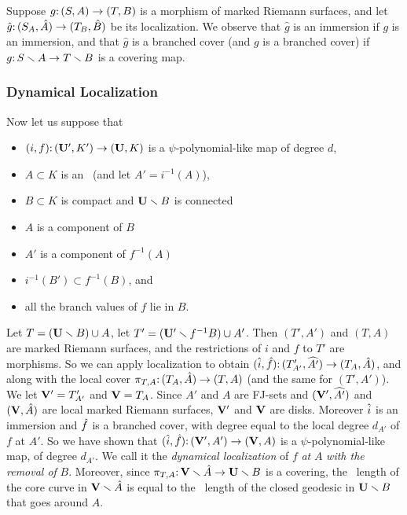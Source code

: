 Suppose $g\mathpunct: (S, A) \to (T, B)$ is a morphism of marked Riemann surfaces,
and let $\hat g\mathpunct: (S_A, \hat A) \to (T_B, \hat B)$ be its localization.
We observe that $\hat g$ is an immersion if $g$ is an immersion,
and that $\hat g$ is a branched cover (and $g$ is a branched cover) if $g\mathpunct: S\smallsetminus A\to T \smallsetminus B$ is a covering map. 


\newcommand{\vv}{\BU \sm B}
\newcommand{\vvp}{\BU' \sm f^{-1}(B')}
\subsubsection{Dynamical Localization}
Now let us suppose that 
\begin{itemize}
\item
$(i, f)\mathpunct: (\mathbf U', K') \to (\mathbf U, K)$ is a $\psi$-polynomial-like map of degree $d$,
\item
$A \subset K$ is an \fjset\  (and let $A' = i^{-1}(A)$),
\item
$B \subset K$ is compact and $\mathbf U \smallsetminus B$ is connected
\item
$A$ is a component of $B$
\item
$A'$ is a component of $f^{-1}(A)$
\item 
$i^{-1}(B') \subset f^{-1}(B)$, and
\item
all the branch values of $f$ lie in $B$.
\end{itemize}
Let $T = (\mathbf U \smallsetminus B) \cup A$,
let $T' = (\mathbf U' \smallsetminus f^{-1} B) \cup A'$.
Then $(T', A')$ and $(T, A)$ are marked Riemann surfaces,
and the restrictions of $i$ and $f$ to $T'$ are morphisms. 
So we can apply localization to obtain $(\hat i, \hat f)\mathpunct: (T'_{A'}, \widehat{A'}) \to (T_A, \hat A)$,
and along with the local cover $\pi_{T, A}\mathpunct: (T_A, \hat A)\to (T, A)$ (and the same for $(T', A')$). 
We let ${\mathbf{V}}' = T'_{A'}$ and ${\mathbf{V}} = T_A$. 
Since $A'$ and $A$ are FJ-sets and $({\mathbf{V}}', \widehat{A'})$ and $({\mathbf{V}}, \hat A)$ are local marked Riemann surfaces,
${\mathbf{V}}'$ and ${\mathbf{V}}$ are disks.
Moreover $\hat i$ is an immersion
and $\hat f$ is a branched cover,
with degree equal to the local degree $d_{A'}$ of $f$ at $A'$.
So we have shown that $(\hat i, \hat f)\mathpunct: ({\mathbf{V}}', A') \to ({\mathbf{V}}, A)$ is a $\psi$-polynomial-like map,
of degree $d_{A'}$. 
We call it the \emph{dynamical localization} of $f$ \emph{at} $A$ \emph{with the removal of} $B$. 
Moreover, 
since $\pi_{T,A} \mathpunct: {\mathbf{V}} \smallsetminus \hat A\to \mathbf U \smallsetminus B$ is a covering,
the \poincare\ length of the core curve in ${\mathbf{V}} \smallsetminus \hat A$
is equal to the \poincare\ length of the closed geodesic in $\mathbf U \smallsetminus B$ that goes around $A$.


